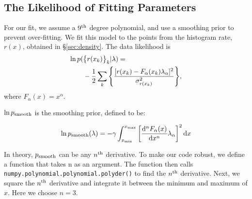 \subsection{The Likelihood of Fitting Parameters}
\label{subsec:likelihood}

For our fit, we assume a $9^{\rm th}$ degree polynomial, and use a smoothing prior to prevent over-fitting. We fit this model to the points from the histogram rate, $r(x)$, obtained in \S\ref{sec:density}. The data likelihood is
%
\begin{align}
  \ln p( &\qty{r(x_k)}_k | \lambda ) = \notag
  \\ &
 -\frac{1}{2}
  \sum_k
  \qty{\frac{[r(x_k) - F_\alpha(x_k) \lambda_\alpha]^2}{\sigma_{r(x_k)}^2}},
%
  \label{likelihood}
\end{align}
%
where $F_\alpha(x) = x^\alpha$.

$\ln p_{\rm smooth}$ is the smoothing prior, defined to be:

\begin{equation}
  \ln p_{\rm smooth}(\lambda) =
 -\gamma \int_{x_{\min}}^{x_{\max}}
  \qty[ \dv[n]{F_\alpha(x)}{x} \lambda_\alpha ]^2 \dd{x}
%
  \label{smoothing_prior}
\end{equation}

In theory, $p_{\rm smooth}$ can be any $n^{\rm th}$ derivative. To make our code robust, we define a function that takes n as an argument. The function then calls \texttt{numpy.polynomial.polynomial.polyder()} to find the $n^{\rm th}$ derivative. Next, we square the $n^{\rm th}$ derivative and integrate it between the minimum and maximum of $x$. Here we choose $n = 3$.